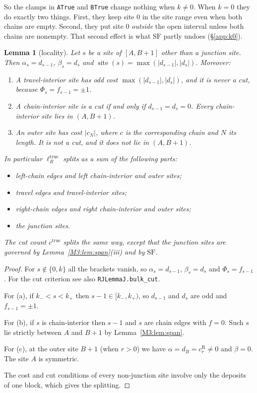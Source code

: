 \documentclass[11pt]{article}
\theoremstyle{plain}
\newtheorem{lemma}[theorem]{Lemma}
\theoremstyle{definition}
\theoremstyle{remark}
\begin{document}
So the clamps in \texttt{ATrue} and \texttt{BTrue} change nothing when $k\ne0$. When $k=0$
they do exactly two things. First, they keep site $0$ in the site range even when both
chains are empty. Second, they put site $0$ \emph{outside} the open interval unless both
chains are nonempty. That second effect is what $\mathrm{SF}$ partly undoes
(\S\ref{app:k0}).

\begin{lemma}[locality]\label{M3:lem:local}
Let $s$ be a site of $[A,B+1]$ other than a junction site. Then
$\alpha_s=d_{s-1}$, $\beta_s=d_s$ and $\operatorname{site}(s)=\max(|d_{s-1}|,|d_s|)$. Moreover:
\begin{enumerate}
\item[(a)] A travel-interior site has odd cost $\max(|d_{s-1}|,|d_s|)$, and it is never a cut,
  because $\Phi_s=f_{s-1}=\pm1$.
\item[(b)] A chain-interior site is a cut if and only if $d_{s-1}=d_s=0$. Every
  chain-interior site lies in $(A,B+1)$.
\item[(c)] An outer site has cost $|c_N|$, where $c$ is the corresponding chain and $N$ its
  length. It is not a cut, and it does not lie in $(A,B+1)$.
\end{enumerate}
In particular $\ell_R^{\mathrm{true}}$ splits as a sum of the following parts:
\begin{itemize}
\item left-chain edges and left chain-interior and outer sites;
\item travel edges and travel-interior sites;
\item right-chain edges and right chain-interior and outer sites;
\item the junction sites.
\end{itemize}
The cut count $c^{\mathrm{true}}$ splits the same way, except that the junction sites are
governed by Lemma~\ref{M3:lem:span}(iii) and by $\mathrm{SF}$.
\end{lemma}

\begin{proof}
For $s\notin\{0,k\}$ all the brackets vanish, so $\alpha_s=d_{s-1}$, $\beta_s=d_s$ and
$\Phi_s=f_{s-1}$. For the cut criterion see also \texttt{RJLemmaJ.bulk\_cut}.

For (a), if $k_-<s<k_+$ then $s-1\in[k_-,k_+)$, so $d_{s-1}$ and $d_s$ are odd and
$f_{s-1}=\pm1$.

For (b), if $s$ is chain-interior then $s-1$ and $s$ are chain edges with $f=0$. Such $s$
lie strictly between $A$ and $B+1$ by Lemma~\ref{M3:lem:span}.

For (c), at the outer site $B+1$ (when $r>0$) we have $\alpha=d_B=c^{\mathrm R}_r\ne0$ and
$\beta=0$. The site $A$ is symmetric.

The cost and cut conditions of every non-junction site involve only the deposits of one
block, which gives the splitting.
\end{proof}
\end{document}
